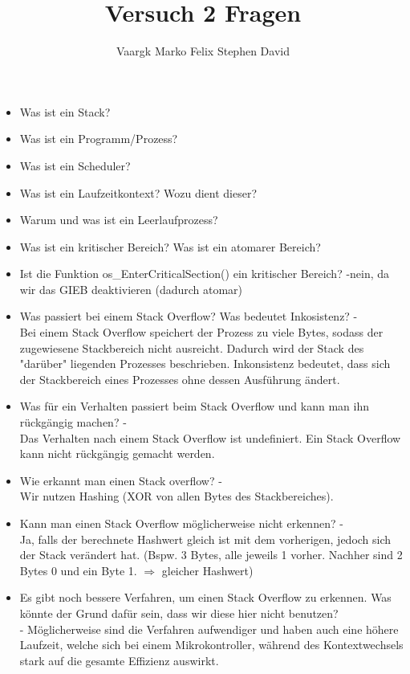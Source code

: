 \documentclass[12pt,a4paper]{article}
\title{Versuch 2 Fragen}
\author{Vaargk Marko Felix Stephen David}
\begin{document}
\maketitle

\begin{itemize}
\item Was ist ein Stack?
\item Was ist ein Programm/Prozess?
\item Was ist ein Scheduler?
\item Was ist ein Laufzeitkontext? Wozu dient dieser?
\item Warum und was ist ein Leerlaufprozess?
\item Was ist ein kritischer Bereich? Was ist ein atomarer Bereich?
\item Ist die Funktion os\_EnterCriticalSection() ein kritischer Bereich? -nein, da wir das GIEB deaktivieren (dadurch atomar)
\item Was passiert bei einem Stack Overflow? Was bedeutet Inkosistenz? -\\
      Bei einem Stack Overflow speichert der Prozess zu viele Bytes, sodass der zugewiesene Stackbereich nicht ausreicht. Dadurch wird der Stack des "darüber" liegenden Prozesses beschrieben. Inkonsistenz bedeutet, dass sich der Stackbereich eines Prozesses ohne dessen Ausführung ändert.
\item Was für ein Verhalten passiert beim Stack Overflow und kann man ihn rückgängig machen? -\\
      Das Verhalten nach einem Stack Overflow ist undefiniert. Ein Stack Overflow kann nicht rückgängig gemacht werden.
\item Wie erkannt man einen Stack overflow? -\\
      Wir nutzen Hashing (XOR von allen Bytes des Stackbereiches).
\item Kann man einen Stack Overflow möglicherweise nicht erkennen? -\\
      Ja, falls der berechnete Hashwert gleich ist mit dem vorherigen, jedoch sich der Stack verändert hat. (Bspw. 3 Bytes, alle jeweils 1 vorher. Nachher sind 2 Bytes 0 und ein Byte 1. $\Rightarrow$ gleicher Hashwert)
\item Es gibt noch bessere Verfahren, um einen Stack Overflow zu erkennen. Was könnte der Grund dafür sein, dass wir diese hier nicht benutzen?\\-
      Möglicherweise sind die Verfahren aufwendiger und haben auch eine höhere Laufzeit, welche sich bei einem Mikrokontroller, während des Kontextwechsels stark auf die gesamte Effizienz auswirkt.

\end{itemize}
\end{document}
